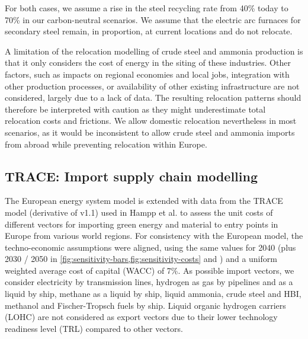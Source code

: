 For both cases, we assume a rise in the steel recycling rate from 40\% today to
70\% in our carbon-neutral
scenarios.\cite{materialeconomicsIndustrialTransformation20502019} We assume
that the electric arc furnaces for secondary steel remain, in proportion, at
current locations and do not relocate.

A limitation of the relocation modelling of crude steel and ammonia production
is that it only considers the cost of energy in the siting of these industries.
Other factors, such as impacts on regional economies and local jobs, integration
with other production processes, or availability of other existing infrastructure are
not considered, largely due to a lack of data. The resulting relocation patterns
should therefore be interpreted with caution as they might underestimate total
relocation costs and frictions. We allow domestic relocation nevertheless in
most scenarios, as it would be inconsistent to allow crude steel and ammonia
imports from abroad while preventing relocation within Europe.

\subsection*{TRACE: Import supply chain modelling}
\label{sec:methods-trace}

The European energy system model is extended with data from the TRACE model
(derivative of v1.1) used in Hampp et al.\cite{hamppImportOptions2023} to assess
the unit costs of different vectors for importing green energy and material to
entry points in Europe from various world regions. For consistency with the
European model, the techno-economic assumptions were aligned, using the same
values for 2040 (plus 2030 / 2050 in
\cref{fig:sensitivity-bars,fig:sensitivity-costs} and )
and a uniform weighted average cost of capital (WACC) of
7\%.\cite{lonerganImprovingRepresentationCost2023} As possible import vectors,
we consider electricity by transmission lines, hydrogen as gas by pipelines and
as a liquid by ship, methane as a liquid by ship, liquid ammonia, crude steel and HBI,
methanol and Fischer-Tropsch fuels by ship. Liquid organic hydrogen carriers
(LOHC) are not considered as export vectors due to their lower technology
readiness level (TRL) compared to other
vectors.\cite{irenaGlobalHydrogenTrade2022}

